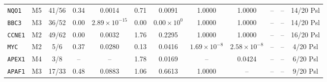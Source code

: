 \documentclass[9pt,a4paper]{article}
\begin{document}
{\begin{tabular}{llcccccccccc}
\texttt{NQO1} & M5 & 41/56 & 0.34 & 0.0014 & 0.71 & 0.0091 & 1.0000 & 1.0000 & -- & -- & 14/20 Psl \\
\texttt{BBC3} & M3 & 36/52 & 0.00 & $2.89\times 10^{-15}$ & 0.00 & $0.00\times 10^{0}$ & 1.0000 & 1.0000 & -- & -- & 14/20 Psl \\
\texttt{CCNE1} & M2 & 49/62 & 0.00 & 0.0032 & 1.76 & 0.2295 & 1.0000 & 1.0000 & -- & -- & 16/20 Psl \\
\texttt{MYC} & M2 & 5/6 & 0.37 & 0.0280 & 0.13 & 0.0416 & $1.69\times 10^{-8}$ & $2.58\times 10^{-8}$ & -- & -- & 4/20 Psl \\
\texttt{APEX1} & M4 & 3/8 & -- & -- & 1.78 & 0.0169 & -- & 0.0424 & -- & -- & 6/20 Psl \\
\texttt{APAF1} & M3 & 17/33 & 0.48 & 0.0883 & 1.06 & 0.6613 & 1.0000 & -- & -- & -- & 9/20 Psl \\
\bottomrule\end{tabular}}\clearpage
\end{document}

